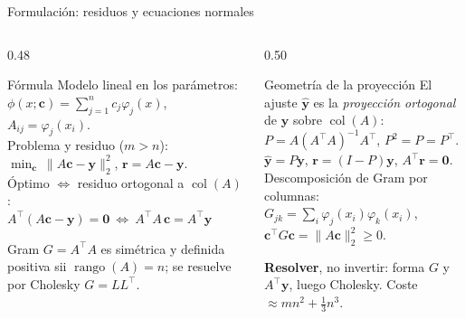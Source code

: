 \documentclass[aspectratio=169,10pt]{beamer}
\begin{document}
\begin{frame}{Formulación: residuos y ecuaciones normales}
\begin{columns}[T]
\begin{column}{0.48\textwidth}
\begin{cardidea}{Fórmula}{\faSuperscript}
{\footnotesize Modelo lineal en los parámetros:\\[0.4mm]
$\phi(x;\mathbf c)=\sum_{j=1}^n c_j\varphi_j(x)$, \; $A_{ij}=\varphi_j(x_i)$.\\[1.2mm]
Problema y residuo ($m>n$):\\[0.2mm]
$\displaystyle\min_{\mathbf c}\ \|A\mathbf c-\mathbf y\|_2^2$, \quad $\mathbf r=A\mathbf c-\mathbf y$.\\[1.2mm]
Óptimo $\Leftrightarrow$ residuo ortogonal a $\operatorname{col}(A)$:\\[0.2mm]
$A^{\!\top}(A\mathbf c-\mathbf y)=\mathbf 0\ \Longleftrightarrow\ \boxed{A^{\!\top}\!A\,\mathbf c=A^{\!\top}\mathbf y}$}
\end{cardidea}
\vspace{1mm}
\begin{cardnota}[\faInfoCircle]
{\footnotesize Gram $G=A^{\!\top}\!A$ es simétrica y definida positiva sii $\operatorname{rango}(A)=n$; se resuelve por Cholesky $G=LL^{\!\top}$.}
\end{cardnota}
\end{column}
\begin{column}{0.50\textwidth}
\begin{cardgear}{Geometría de la proyección}{\faCogs}
{\footnotesize El ajuste $\hat{\mathbf y}$ es la \emph{proyección ortogonal} de $\mathbf y$ sobre $\operatorname{col}(A)$:\\[1.0mm]
$P=A(A^{\!\top}\!A)^{-1}A^{\!\top}$, \quad $P^2=P=P^{\!\top}$.\\[1.0mm]
$\hat{\mathbf y}=P\mathbf y$, \quad $\mathbf r=(I-P)\mathbf y$, \quad $A^{\!\top}\mathbf r=\mathbf 0$.\\[1.2mm]
Descomposición de Gram por columnas:\\[0.2mm]
$G_{jk}=\sum_i\varphi_j(x_i)\varphi_k(x_i)$, \quad $\mathbf c^{\!\top}G\mathbf c=\|A\mathbf c\|_2^2\ge0$.}
\end{cardgear}
\vspace{1mm}
\begin{cardnota}[\faExclamationTriangle]
{\footnotesize \textbf{Resolver}, no invertir: forma $G$ y $A^{\!\top}\mathbf y$, luego Cholesky. Coste $\approx mn^2+\tfrac13 n^3$.}
\end{cardnota}
\end{column}
\end{columns}
\end{frame}
\end{document}
